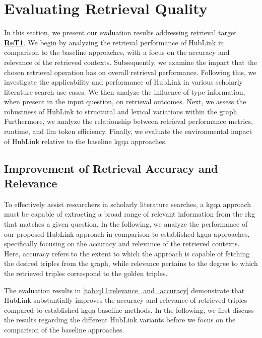 


\section{Evaluating Retrieval Quality}
\label{sec:evaluating_relevance_and_robustness_of_retrieved_contexts}

In this section, we present our evaluation results addressing retrieval target \hyperref[sec:evaluation_goals_and_metrics]{\textbf{ReT1}}. We begin by analyzing the retrieval performance of HubLink in comparison to the baseline approaches, with a focus on the accuracy and relevance of the retrieved contexts. Subsequently, we examine the impact that the chosen retrieval operation has on overall retrieval performance. Following this, we investigate the applicability and performance of HubLink in various scholarly literature search use cases. We then analyze the influence of type information, when present in the input question, on retrieval outcomes. Next, we assess the robustness of HubLink to structural and lexical variations within the graph. Furthermore, we analyze the relationship between retrieval performance metrics, runtime, and \gls{llm} token efficiency. Finally, we evaluate the environmental impact of HubLink relative to the baseline \gls{kgqa} approaches.

\subsection{Improvement of Retrieval Accuracy and Relevance}
\label{sec:results_retrieval_relevance_and_accuracy}

To effectively assist researchers in scholarly literature searches, a \gls{kgqa} approach must be capable of extracting a broad range of relevant information from the \gls{rkg} that matches a given question. In the following, we analyze the performance of our proposed HubLink approach in comparison to established \gls{kgqa} approaches, specifically focusing on the accuracy and relevance of the retrieved contexts. Here, accuracy refers to the extent to which the approach is capable of fetching the desired triples from the graph, while relevance pertains to the degree to which the retrieved triples correspond to the golden triples. 

The evaluation results in \autoref{tab:q11:relevance_and_accuracy} demonstrate that HubLink substantially improves the accuracy and relevance of retrieved triples compared to established \gls{kgqa} baseline methods. In the following, we first discuss the results regarding the different HubLink variants before we focus on the comparison of the baseline approaches.

